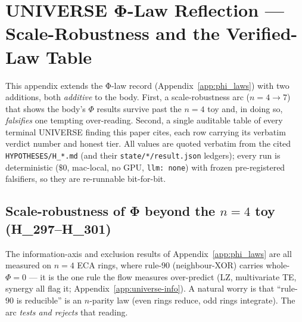 \section{UNIVERSE Φ-Law Reflection --- Scale-Robustness and the Verified-Law Table}
\label{app:universe_laws}

This appendix extends the Φ-law record (Appendix~\ref{app:phi_laws}) with two
additions, both \emph{additive} to the body. First, a scale-robustness arc
($n{=}4\!\rightarrow\!7$) that shows the body's $\Phi$ results survive past the
$n{=}4$ toy and, in doing so, \emph{falsifies} one tempting over-reading.
Second, a single auditable table of every terminal UNIVERSE finding this paper
cites, each row carrying its verbatim verdict number and honest tier. All values
are quoted verbatim from the cited \texttt{HYPOTHESES/H\_*.md} (and their
\texttt{state/*/result.json} ledgers); every run is deterministic
($\$0$, mac-local, no GPU, \texttt{llm: none}) with frozen pre-registered
falsifiers, so they are re-runnable bit-for-bit.

\subsection{Scale-robustness of Φ beyond the $n{=}4$ toy (H\_297--H\_301)}
\label{app:universe-scale}

The information-axis and exclusion results of Appendix~\ref{app:phi_laws} are all
measured on $n{=}4$ ECA rings, where rule-$90$ (neighbour-XOR) carries whole-$\Phi
{=}0$ --- it is the one rule the flow measures over-predict (LZ, multivariate TE,
synergy all flag it; Appendix~\ref{app:universe-info}). A natural worry is that
``rule-$90$ is reducible'' is an $n$-parity law (even rings reduce, odd rings
integrate). The arc \emph{tests and rejects} that reading.

